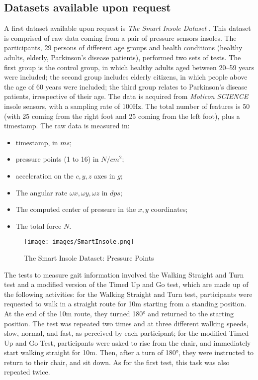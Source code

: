 \subsection{Datasets available upon request}
A first dataset available upon request is \textit{The Smart Insole Dataset} \cite{TheSmartInsoleDataset}. This dataset is comprised of raw data coming from a pair of pressure sensors insoles.
The participants, 29 persons of different age groups and health conditions (healthy adults, elderly, Parkinson’s disease patients), performed two sets of tests. The first group is the control group, in which healthy adults aged between 20–59 years were included; the second group includes elderly citizens, in which people above the age of 60 years were included; the third group relates to Parkinson’s disease patients, irrespective of their age. 
The data is acquired from \textit{Moticon SCIENCE} insole sensors, with a sampling rate of 100Hz. The total number of features is 50 (with 25 coming from the right foot and 25 coming from the left foot), plus a timestamp. The raw data is measured in: 
\begin{itemize}
    \item timestamp, in \(ms\);
    \item pressure points (1 to 16) in \(N/cm^2\);
    \item acceleration on the \(c, y, z\) axes in \(g\);
    \item The angular rate \(\omega x, \omega y, \omega z\) in \(dps\);
    \item The computed center of pressure in the \(x,y\) coordinates;
    \item The total force \(N\).
\end{itemize}
\begin{figure}
    \centering
    \texttt{[image: images/SmartInsole.png]}
    \caption{The Smart Insole Dataset: Pressure Points}
    \label{fig:SmartInsole}
    \FloatBarrier
\end{figure}
The tests to measure gait information involved the Walking Straight and Turn test and a modified version of the Timed Up and Go test, which are made up of the following activities: for the Walking Straight and Turn test, participants were requested to walk in a straight route for 10m starting from a standing position. At the end of the 10m route, they turned 180° and returned to the starting position. The test was repeated two times and at three different walking speeds, slow, normal, and fast, as perceived by each participant; for the modified Timed Up and Go Test, participants were asked to rise from the chair, and immediately start walking straight for 10m. Then, after a turn of 180°, they were instructed to return to their chair, and sit down. As for the first test, this task was also repeated twice.

